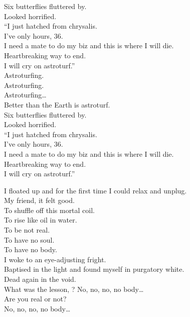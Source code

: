 Six butterflies fluttered by. \\
Looked horrified. \\
``I just hatched from chrysalis. \\
I've only hours, 36. \\
I need a mate to do my biz and this is where I will die. \\
Heartbreaking way to end. \\
I will cry on astroturf.'' \\

Astroturfing. \\
Astroturfing. \\
Astroturfing… \\
Better than the Earth is astroturf. \\

Six butterflies fluttered by. \\
Looked horrified. \\
``I just hatched from chrysalis. \\
I've only hours, 36. \\
I need a mate to do my biz and this is where I will die. \\
Heartbreaking way to end. \\
I will cry on astroturf.'' \\




I floated up and for the first time I could relax and unplug. \\
My friend, it felt good. \\

To shuffle off this mortal coil. \\
To rise like oil in water. \\

To be not real. \\
To have no soul. \\
To have no body. \\

I woke to an eye-adjusting fright. \\
Baptised in the light and found myself in purgatory white. \\
Dead again in the void. \\

What was the lesson, ?
No, no, no, no body… \\
Are you real or not? \\
No, no, no, no body… \\

